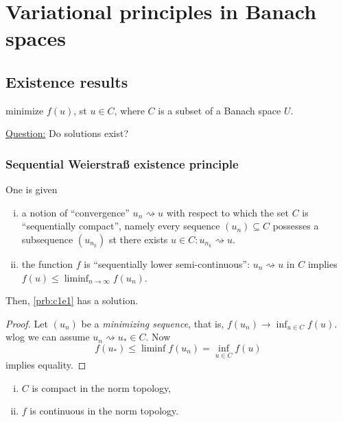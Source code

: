 \documentclass[../skript.tex]{subfiles}
\begin{document}
\chapter{Variational principles in Banach spaces} %
\label{sec:c1}
\section{Existence results} %
\label{sec:c1e1}
\begin{problem} %
\label{prb:c1e1}
minimize $f(u)$, \ac{st} $u \in C$, where $C$ is a subset of a Banach space $U$.
\end{problem}
\underline{Question:} Do solutions exist?
\subsection{Sequential Weierstraß existence principle}
One is given
\begin{enumerate}[(i)]
\item a notion of ``convergence'' $u_n \rightsquigarrow u$ with respect to which the set $C$ is ``sequentially compact'', namely every sequence $(u_n) \subseteq C$ possesses a subsequence $(u_{n_k})$ \ac{st} there exists $u \in C: u_{n_k} \rightsquigarrow u$.
\item the function $f$ is ``sequentially lower semi-continuous'': $u_n \rightsquigarrow u$ in $C$ implies $f(u) \leq \liminf_{n \to \infty} f(u_n)$.
\end{enumerate}
Then, \cref{prb:c1e1} has a solution.
\begin{proof}
Let $(u_n)$ be a \emph{minimizing sequence}, that is, $f(u_n) \to \inf_{u \in C} f(u)$.
\Ac{wlog} we can assume $u_n \rightsquigarrow u_* \in C$.
Now
\[
	f(u_*) \leq \liminf f(u_n) = \inf_{u \in C} f(u)
\]
implies equality.
\end{proof}
\begin{examplenumb} %
\label{ex:c1e1}
\begin{enumerate}[(i)]
\item $C$ is compact in the norm topology,
\item $f$ is continuous in the norm topology.
\end{enumerate}
\end{examplenumb}
\end{document}
